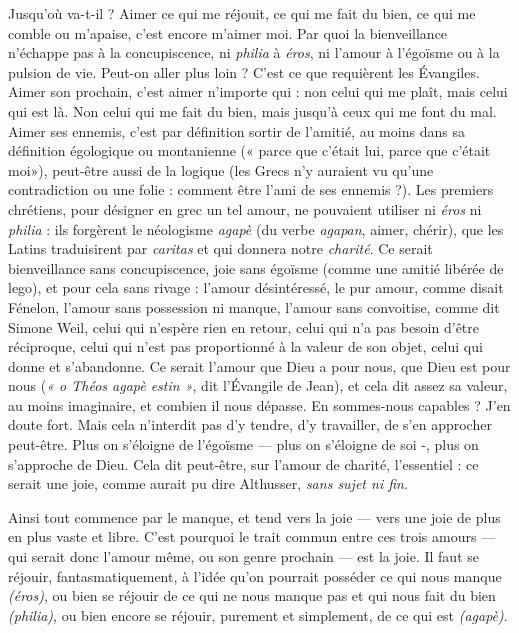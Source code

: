 Jusqu'où va-t-il ? Aimer ce qui me réjouit, ce qui me fait du bien, ce qui me
comble ou m’apaise, c’est encore m’aimer moi. Par quoi la bienveillance
n'échappe pas à la concupiscence, ni {\it philia} à {\it éros}, ni l'amour à l’égoïsme ou à
la pulsion de vie. Peut-on aller plus loin ? C'est ce que requièrent les Évangiles.
Aimer son prochain, c’est aimer n’importe qui : non celui qui me plaît, mais
celui qui est là. Non celui qui me fait du bien, mais jusqu’à ceux qui me font
du mal. Aimer ses ennemis, c’est par définition sortir de l’amitié, au moins
dans sa définition égologique ou montanienne (« parce que c'était lui, parce
que c'était moi»), peut-être aussi de la logique (les Grecs n’y auraient vu
qu’une contradiction ou une folie : comment être l’ami de ses ennemis ?). Les
premiers chrétiens, pour désigner en grec un tel amour, ne pouvaient utiliser ni
{\it éros} ni {\it philia} : ils forgèrent le néologisme {\it agapè} (du verbe {\it agapan}, aimer,
chérir), que les Latins traduisirent par {\it caritas} et qui donnera notre {\it charité}. Ce
serait bienveillance sans concupiscence, joie sans égoïsme (comme une amitié
libérée de lego), et pour cela sans rivage : l'amour désintéressé, le pur amour,
comme disait Fénelon, l'amour sans possession ni manque, l’amour sans
convoitise, comme dit Simone Weil, celui qui n’espère rien en retour, celui qui
n’a pas besoin d’être réciproque, celui qui n’est pas proportionné à la valeur de
son objet, celui qui donne et s’abandonne. Ce serait l'amour que Dieu a pour
nous, que Dieu est pour nous ({\it « o Théos agapè estin »}, dit l'Évangile de Jean), et
cela dit assez sa valeur, au moins imaginaire, et combien il nous dépasse. En
sommes-nous capables ? J'en doute fort. Mais cela n’interdit pas d’y tendre, d'y
travailler, de s’en approcher peut-être. Plus on s’éloigne de l’égoïsme — plus on
s'éloigne de soi -, plus on s’approche de Dieu. Cela dit peut-être, sur l’amour
de charité, l'essentiel : ce serait une joie, comme aurait pu dire Althusser, {\it sans
sujet ni fin}.

Ainsi tout commence par le manque, et tend vers la joie — vers une joie de
plus en plus vaste et libre. C’est pourquoi le trait commun entre ces trois
amours — qui serait donc l’amour même, ou son genre prochain — est la joie. Il
faut se réjouir, fantasmatiquement, à l’idée qu’on pourrait posséder ce qui nous
manque {\it (éros)}, ou bien se réjouir de ce qui ne nous manque pas et qui nous fait
du bien {\it (philia)}, ou bien encore se réjouir, purement et simplement, de ce qui
est {\it (agapè)}.

